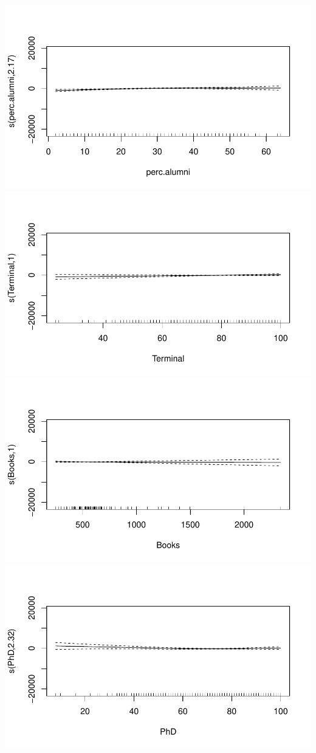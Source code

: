 \documentclass[
]{article}
\begin{document}
\includegraphics[width=0.9\linewidth]{HW2_co2554_files/figure-latex/GAM-1}
\includegraphics[width=0.9\linewidth]{HW2_co2554_files/figure-latex/GAM-2}
\includegraphics[width=0.9\linewidth]{HW2_co2554_files/figure-latex/GAM-3}
\includegraphics[width=0.9\linewidth]{HW2_co2554_files/figure-latex/GAM-4}
\end{document}

